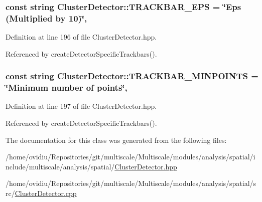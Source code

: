 \hypertarget{classmultiscale_1_1analysis_1_1ClusterDetector_a656f64f88c73c25824e5a4416a742aaf}{
\subsubsection[{T\-R\-A\-C\-K\-B\-A\-R\-\_\-\-E\-P\-S}]{\setlength{\rightskip}{0pt plus 5cm}const string Cluster\-Detector\-::\-T\-R\-A\-C\-K\-B\-A\-R\-\_\-\-E\-P\-S = \char`\"{}Eps (Multiplied by 10)\char`\"{}\hspace{0.3cm}{\ttfamily [static]}, {\ttfamily [private]}}}\label{classmultiscale_1_1analysis_1_1ClusterDetector_a656f64f88c73c25824e5a4416a742aaf}


Definition at line 196 of file Cluster\-Detector.\-hpp.



Referenced by create\-Detector\-Specific\-Trackbars().

\hypertarget{classmultiscale_1_1analysis_1_1ClusterDetector_a7f0fbbf3de8479b106893c4a8161bdaf}{
\subsubsection[{T\-R\-A\-C\-K\-B\-A\-R\-\_\-\-M\-I\-N\-P\-O\-I\-N\-T\-S}]{\setlength{\rightskip}{0pt plus 5cm}const string Cluster\-Detector\-::\-T\-R\-A\-C\-K\-B\-A\-R\-\_\-\-M\-I\-N\-P\-O\-I\-N\-T\-S = \char`\"{}Minimum number of points\char`\"{}\hspace{0.3cm}{\ttfamily [static]}, {\ttfamily [private]}}}\label{classmultiscale_1_1analysis_1_1ClusterDetector_a7f0fbbf3de8479b106893c4a8161bdaf}


Definition at line 197 of file Cluster\-Detector.\-hpp.



Referenced by create\-Detector\-Specific\-Trackbars().



The documentation for this class was generated from the following files\-:\begin{DoxyCompactItemize}
\item 
/home/ovidiu/\-Repositories/git/multiscale/\-Multiscale/modules/analysis/spatial/include/multiscale/analysis/spatial/\hyperlink{ClusterDetector_8hpp}{Cluster\-Detector.\-hpp}\item 
/home/ovidiu/\-Repositories/git/multiscale/\-Multiscale/modules/analysis/spatial/src/\hyperlink{ClusterDetector_8cpp}{Cluster\-Detector.\-cpp}\end{DoxyCompactItemize}
